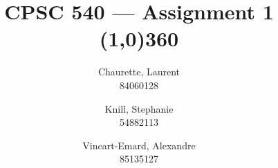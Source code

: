 \documentclass[11pt, oneside]{article}   	%
\theoremstyle{definition}
\theoremstyle{remark}
\begin{document}
\title{CPSC 540 --- Assignment 1 \\
\line(1,0){360} \\				%
\vspace{0.5cm}
}


\author{
Chaurette, Laurent\\
84060128
\and
Knill, Stephanie\\
54882113
\and
Vincart-Emard, Alexandre\\
85135127
}
\date{}
\maketitle


\end{document}
